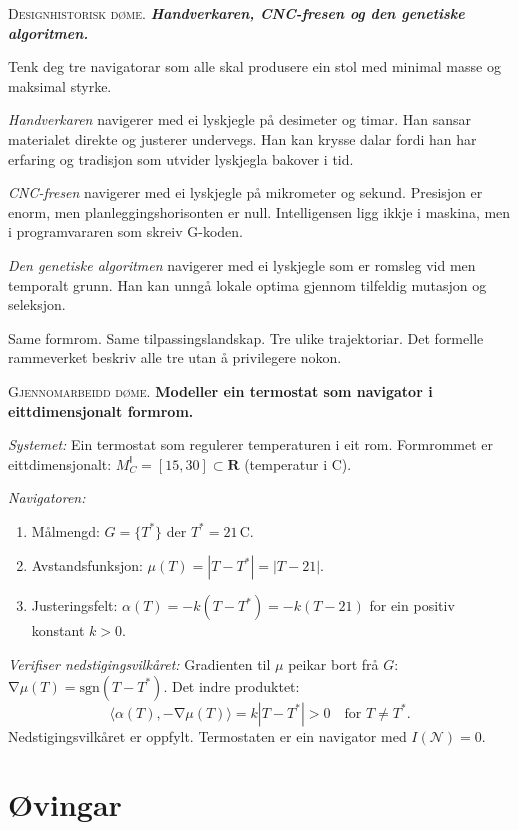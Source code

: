 \documentclass[10pt]{book}
\theoremstyle{definition}
\theoremstyle{plain}
\theoremstyle{remark}
\newenvironment{designhistorie}%
  {\medskip\noindent\textsc{Designhistorisk d\o me.}\itshape\enspace}%
  {\medskip}
\newenvironment{gjennomgang}%
  {\medskip\noindent\textsc{Gjennomarbeidd d\o me.}\enspace}%
  {\medskip}
\newcommand{\MC}{M^{\mathsf{I}}_C}
\providecommand{\R}{}
\renewcommand{\R}{\mathbf{R}}
\newcommand{\Nav}{\mathcal{N}}
\newcommand{\inner}[2]{\langle #1, #2 \rangle}
\DeclareMathOperator{\grad}{\nabla}
\begin{document}
\begin{designhistorie}
\textbf{Handverkaren, CNC-fresen og den genetiske algoritmen.}

Tenk deg tre navigatorar som alle skal produsere ein stol med minimal masse og maksimal styrke.

\textit{Handverkaren} navigerer med ei lyskjegle p\aa{} desimeter og timar. Han sansar materialet direkte og justerer undervegs. Han kan krysse dalar fordi han har erfaring og tradisjon som utvider lyskjegla bakover i tid.

\textit{CNC-fresen} navigerer med ei lyskjegle p\aa{} mikrometer og sekund. Presisjon er enorm, men planleggingshorisonten er null. Intelligensen ligg ikkje i maskina, men i programvararen som skreiv G-koden.

\textit{Den genetiske algoritmen} navigerer med ei lyskjegle som er romsleg vid men temporalt grunn. Han kan unng\aa{} lokale optima gjennom tilfeldig mutasjon og seleksjon.

Same formrom. Same tilpassingslandskap. Tre ulike trajektoriar. Det formelle rammeverket beskriv alle tre utan \aa{} privilegere nokon.
\end{designhistorie}

\begin{gjennomgang}
\textbf{Modeller ein termostat som navigator i eittdimensjonalt formrom.}

\textit{Systemet:} Ein termostat som regulerer temperaturen i eit rom. Formrommet er eittdimensjonalt: $\MC = [15, 30] \subset \R$ (temperatur i \textdegree C).

\textit{Navigatoren:}
\begin{enumerate}[label=(\alph*)]
  \item M\aa lmengd: $G = \{T^*\}$ der $T^* = 21$\,\textdegree C.
  \item Avstandsfunksjon: $\mu(T) = |T - T^*| = |T - 21|$.
  \item Justeringsfelt: $\alpha(T) = -k(T - T^*) = -k(T - 21)$ for ein positiv konstant $k > 0$.
\end{enumerate}

\textit{Verifiser nedstigingsvilk\aa ret:} Gradienten til $\mu$ peikar bort fr\aa{} $G$: $\grad\mu(T) = \text{sgn}(T - T^*)$. Det indre produktet:
\[
  \inner{\alpha(T)}{-\grad\mu(T)} = k|T - T^*| > 0 \quad \text{for } T \neq T^*.
\]
Nedstigingsvilk\aa ret er oppfylt. Termostaten er ein navigator med $I(\Nav) = 0$.
\end{gjennomgang}

\section{\O vingar}
\end{document}
